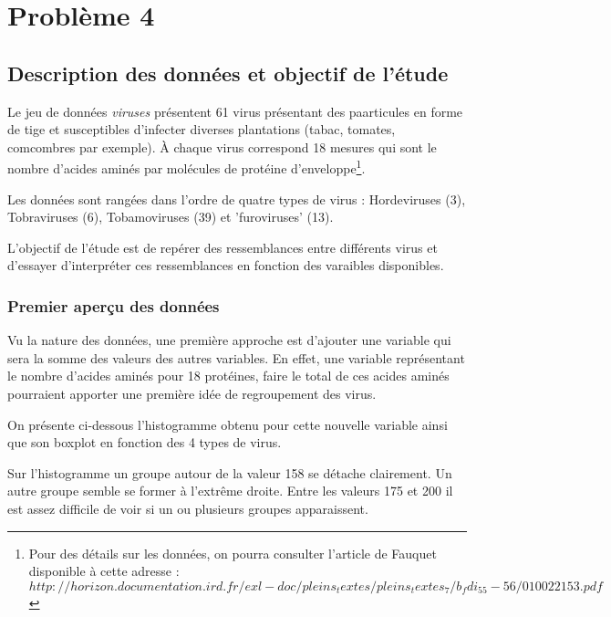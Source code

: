 \documentclass[a4paper]{report}
\begin{document}
  
   \chapter{Problème 4}
 
\section{Description des données et objectif de l'étude}
Le jeu de données \emph{viruses} présentent 61 virus présentant des paarticules en forme de tige et susceptibles d'infecter diverses plantations (tabac, tomates, comcombres par exemple). À chaque virus correspond 18 mesures qui sont le nombre d'acides aminés par molécules de protéine d'enveloppe\footnote{Pour des détails sur les données, on pourra consulter l'article de Fauquet disponible à cette adresse : $http://horizon.documentation.ird.fr/exl-doc/pleins_textes/pleins_textes_7/b_fdi_55-56/010022153.pdf$}. 

Les données sont rangées dans l'ordre de quatre types de virus : Hordeviruses (3), Tobraviruses (6), Tobamoviruses (39) et 'furoviruses' (13). 

L'objectif de l'étude est de repérer des ressemblances entre différents virus et d'essayer d'interpréter ces ressemblances en fonction des varaibles disponibles. 

\subsection{Premier aperçu des données}
Vu la nature des données, une première approche est d'ajouter une variable qui sera la somme des valeurs des autres variables. En effet, une variable représentant le nombre d'acides aminés pour 18 protéines, faire le total de ces acides aminés pourraient apporter une première idée de regroupement des virus.

On présente ci-dessous l'histogramme obtenu pour cette nouvelle variable ainsi que son boxplot en fonction des 4 types de virus.

 \begin{figure}[!ht]
	\centering

\end{figure}

Sur l'histogramme un groupe autour de la valeur 158 se détache clairement. Un autre groupe semble se former à l'extrême droite. Entre les valeurs 175 et 200 il est assez difficile de voir si un ou plusieurs groupes apparaissent.  
\end{document}
